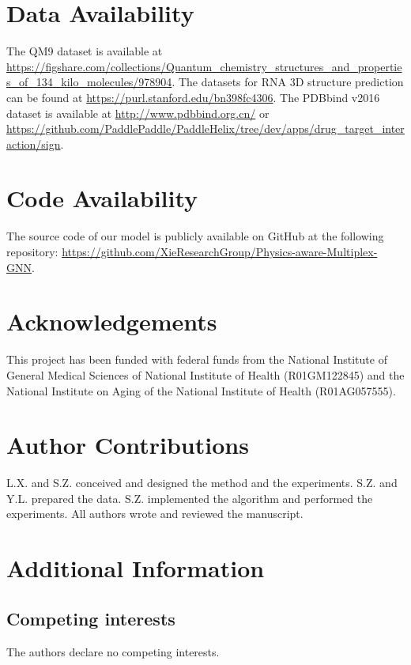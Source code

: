 \documentclass[fleqn,10pt]{wlscirep}
\begin{document}
\section*{Data Availability}
The QM9 dataset is available at \url{https://figshare.com/collections/Quantum_chemistry_structures_and_properties_of_134_kilo_molecules/978904}. The datasets for RNA 3D structure prediction can be found at \url{https://purl.stanford.edu/bn398fc4306}. The PDBbind v2016 dataset is available at \url{http://www.pdbbind.org.cn/} or \url{https://github.com/PaddlePaddle/PaddleHelix/tree/dev/apps/drug_target_interaction/sign}.

\section*{Code Availability}
The source code of our model is publicly available on GitHub at the following repository: \url{https://github.com/XieResearchGroup/Physics-aware-Multiplex-GNN}.





\section*{Acknowledgements}
This project has been funded with federal funds from the National Institute of General Medical Sciences of National Institute of Health (R01GM122845) and the National Institute on Aging of the National Institute of Health (R01AG057555).

\section*{Author Contributions}
L.X. and S.Z. conceived and designed the method and the experiments.  S.Z. and Y.L. prepared the data. S.Z. implemented the algorithm and performed the experiments. All authors wrote and reviewed the manuscript.

\section*{Additional Information}
\subsection*{Competing interests}
The authors declare no competing interests.




\newpage
\appendix

\setcounter{figure}{0}
\renewcommand{\thefigure}{S\arabic{figure}}
\end{document}
